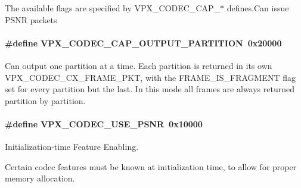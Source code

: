 The available flags are specified by V\-P\-X\-\_\-\-C\-O\-D\-E\-C\-\_\-\-C\-A\-P\-\_\-$\ast$ defines.\-Can issue P\-S\-N\-R packets \hypertarget{group__encoder_ga69768adb51faa28d98870cbc77e9ea93}{
\paragraph[{V\-P\-X\-\_\-\-C\-O\-D\-E\-C\-\_\-\-C\-A\-P\-\_\-\-O\-U\-T\-P\-U\-T\-\_\-\-P\-A\-R\-T\-I\-T\-I\-O\-N}]{\setlength{\rightskip}{0pt plus 5cm}\#define V\-P\-X\-\_\-\-C\-O\-D\-E\-C\-\_\-\-C\-A\-P\-\_\-\-O\-U\-T\-P\-U\-T\-\_\-\-P\-A\-R\-T\-I\-T\-I\-O\-N~0x20000}}\label{group__encoder_ga69768adb51faa28d98870cbc77e9ea93}
Can output one partition at a time. Each partition is returned in its own V\-P\-X\-\_\-\-C\-O\-D\-E\-C\-\_\-\-C\-X\-\_\-\-F\-R\-A\-M\-E\-\_\-\-P\-K\-T, with the F\-R\-A\-M\-E\-\_\-\-I\-S\-\_\-\-F\-R\-A\-G\-M\-E\-N\-T flag set for every partition but the last. In this mode all frames are always returned partition by partition. \hypertarget{group__encoder_ga57bb9eb1881c7e4bf86580660a5e40a0}{
\paragraph[{V\-P\-X\-\_\-\-C\-O\-D\-E\-C\-\_\-\-U\-S\-E\-\_\-\-P\-S\-N\-R}]{\setlength{\rightskip}{0pt plus 5cm}\#define V\-P\-X\-\_\-\-C\-O\-D\-E\-C\-\_\-\-U\-S\-E\-\_\-\-P\-S\-N\-R~0x10000}}\label{group__encoder_ga57bb9eb1881c7e4bf86580660a5e40a0}


Initialization-\/time Feature Enabling. 

Certain codec features must be known at initialization time, to allow for proper memory allocation.

